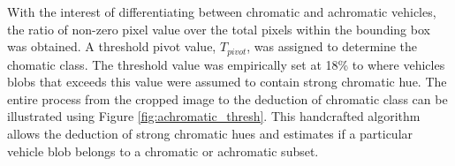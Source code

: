 With the interest of differentiating between chromatic and achromatic vehicles, the ratio of non-zero pixel value over the total pixels within the bounding box was obtained.
A threshold pivot value, $T_{pivot}$, was assigned to determine the chomatic class. The threshold value was empirically set at 18\% to where vehicles blobs that exceeds this value were assumed to contain strong chromatic hue.
The entire process from the cropped image to the deduction of chromatic class can be illustrated using Figure \ref{fig:achromatic_thresh}. This handcrafted algorithm allows the deduction of strong chromatic hues and estimates if a particular vehicle blob belongs to a chromatic or achromatic subset.


